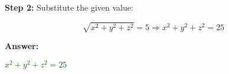 \documentclass[10pt]{article}                               %
\begin{document}
\begin{adjustwidth}{2em}{0pt}
\begin{adjustwidth}{2em}{0pt}
\begin{examplebox}
\begin{adjustwidth}{2em}{0pt}
                    \vspace{0.5em}
            
                    \textbf{Step 2:} Substitute the given value:
            
                    \vspace{0.25em}
            
                    \[ \sqrt{x^2 + y^2 + z^2} = 5 \Rightarrow x^2 + y^2 + z^2 = 25 \]
            
                    \vspace{0.5em}
            
                    \textbf{Answer:}
            
                    \vspace{0.25em}
            
                    \textcolor{darkgreen}{\( x^2 + y^2 + z^2 = 25 \)}
            
                \end{adjustwidth}
            
            \end{examplebox}

    \end{adjustwidth}

\end{adjustwidth}
\end{document}
